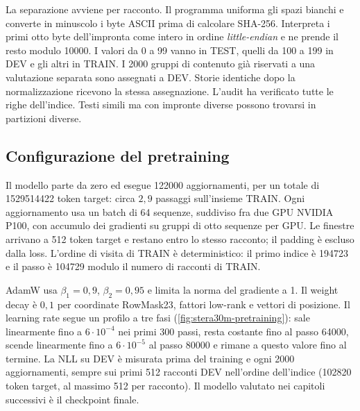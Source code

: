 La separazione avviene per racconto. Il programma uniforma gli spazi bianchi e converte in minuscolo i byte ASCII prima di calcolare SHA-256. Interpreta i primi otto byte dell'impronta come intero in ordine \emph{little-endian} e ne prende il resto modulo \num{10000}. I valori da 0 a 99 vanno in TEST, quelli da 100 a 199 in DEV e gli altri in TRAIN. I \num{2000} gruppi di contenuto già riservati a una valutazione separata sono assegnati a DEV. Storie identiche dopo la normalizzazione ricevono la stessa assegnazione. L'audit ha verificato tutte le righe dell'indice. Testi simili ma con impronte diverse possono trovarsi in partizioni diverse.

\subsection{Configurazione del pretraining}
\label{sec:stera30m-config-training}

Il modello parte da zero ed esegue \num{122000} aggiornamenti, per un totale di \num{1529514422} token target: circa $2{,}9$ passaggi sull'insieme TRAIN. Ogni aggiornamento usa un batch di 64 sequenze, suddiviso fra due GPU NVIDIA P100, con accumulo dei gradienti su gruppi di otto sequenze per GPU. Le finestre arrivano a 512 token target e restano entro lo stesso racconto; il padding è escluso dalla loss. L'ordine di visita di TRAIN è deterministico: il primo indice è \num{194723} e il passo è \num{104729} modulo il numero di racconti di TRAIN.

AdamW usa $\beta_1=0{,}9$, $\beta_2=0{,}95$ e limita la norma del gradiente a 1. Il weight decay è $0{,}1$ per coordinate RowMask23, fattori low-rank e vettori di posizione. Il learning rate segue un profilo a tre fasi (\autoref{fig:stera30m-pretraining}): sale linearmente fino a $6\cdot10^{-4}$ nei primi 300 passi, resta costante fino al passo \num{64000}, scende linearmente fino a $6\cdot10^{-5}$ al passo \num{80000} e rimane a questo valore fino al termine. La NLL su DEV è misurata prima del training e ogni \num{2000} aggiornamenti, sempre sui primi 512 racconti DEV nell'ordine dell'indice (\num{102820} token target, al massimo 512 per racconto). Il modello valutato nei capitoli successivi è il checkpoint finale.

